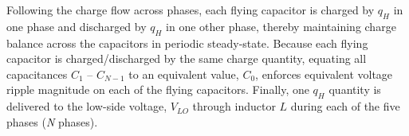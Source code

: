 Following the charge flow across phases, each flying capacitor is charged by $q_{H}$ in one phase and discharged by $q_{H}$ in one other phase, thereby maintaining charge balance across the capacitors in periodic steady-state.
Because each flying capacitor is charged/discharged by the same charge quantity, equating all capacitances $C_1 \text{ -- } C_{N-1}$ to an equivalent value, $C_{0}$, enforces equivalent voltage ripple magnitude on each of the flying capacitors.
Finally, one $q_{H}$ quantity is delivered to the low-side voltage, $V_{LO}$ through inductor $L$ during each of the five phases (\textit{N} phases).




    
